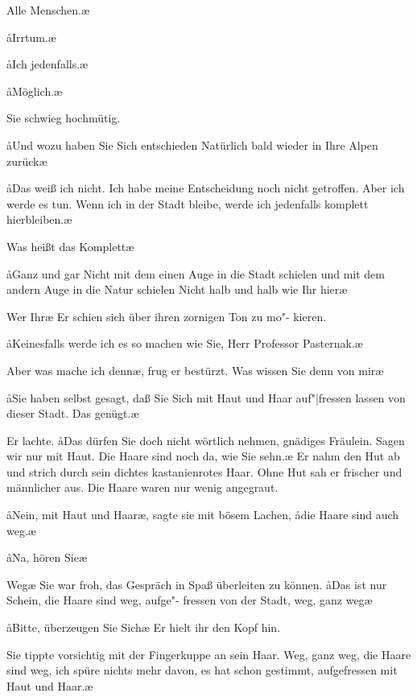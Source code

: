 \aanah{}Alle Menschen.\ae{}

\aa{}Irrtum.\ae{}

\aa{}Ich jedenfalls.\ae{}

\aa{}Möglich.\ae{}

Sie schwieg hochmütig.

\aa{}Und wozu haben Sie Sich\eingriff{eS76-1}{Sich ] sich} entschieden\frag{} Natürlich bald wieder
in Ihre Alpen zurück\frag{}\ae{}

\aa{}Das weiß ich nicht. Ich habe meine Entscheidung noch nicht
getroffen. Aber ich werde es tun. Wenn ich in der Stadt bleibe,
werde ich jedenfalls komplett hierbleiben.\ae{}

\aanah{}Was heißt das\frag{} Komplett\frag{}\ae{}

\aa{}Ganz und gar\ausr{} Nicht mit dem einen Auge in die Stadt
schielen und mit dem andern Auge in die Natur schielen\ausr{}
Nicht halb und halb wie Ihr hier\ausr{}\ae{}

\aanah{}Wer Ihr\frag{}\ae{} Er schien sich über ihren zornigen Ton zu mo"-%
kieren.

\aa{}Keinesfalls werde ich es so machen wie Sie, Herr Professor
Pasternak.\ae{}

\aanah{}Aber was mache ich denn\frag{}\ae{}, frug er bestürzt. \aanah{}Was wissen
Sie denn von mir\frag{}\ae{}

\aa{}Sie haben selbst gesagt, daß Sie Sich\eingriff{eS76-2}{Sich ] sich} mit Haut und Haar
auf"|fressen lassen von dieser Stadt. Das genügt.\ae{}

Er lachte. \aa{}Das dürfen Sie doch nicht wörtlich nehmen,
gnädiges Fräulein. Sagen wir nur \haa{}mit Haut\hae{}. Die Haare
sind noch da, wie Sie sehn.\ae{} Er nahm den Hut ab und strich
durch sein dichtes kastanienrotes Haar. Ohne Hut sah er frischer
und männlicher aus. Die Haare waren nur wenig angegraut.

\aa{}Nein, mit Haut und Haar\ae{},\eingriff{eS76-3}{Haar\ae{}, ] Haar,\ae{}} sagte sie mit bösem Lachen, \aa{}die
Haare sind auch weg.\ae{}

\aa{}Na, hören Sie\ausr{}\ae{}

\aanah{}Weg\ausr{}\ae{} Sie war froh, das Gespräch in Spaß überleiten zu
können. \aa{}Das ist nur Schein, die Haare sind weg, aufge"-%
fressen von der Stadt, weg, ganz weg\ausr{}\ae{}

\aa{}Bitte, überzeugen Sie Sich\eingriff{eS77-1}{Sich ] sich}\ausr{}\ae{} Er hielt ihr den Kopf hin.

Sie tippte vorsichtig mit der Fingerkuppe an sein Haar.
\aanah{}Weg, ganz weg, die Haare sind weg, ich spüre nichts mehr
davon, es hat schon gestimmt, aufgefressen mit Haut und
Haar.\ae{}

